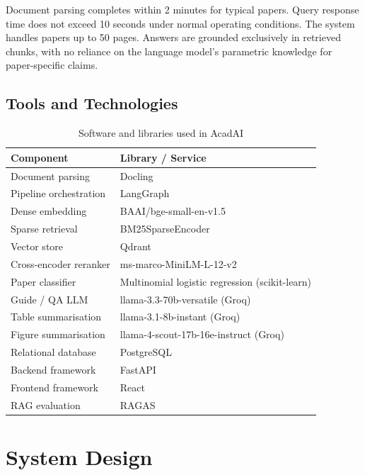 \documentclass[12pt,a4paper]{report}
\begin{document}
Document parsing completes within 2 minutes for typical papers. Query response
time does not exceed 10 seconds under normal operating conditions. The system
handles papers up to 50 pages. Answers are grounded exclusively in retrieved
chunks, with no reliance on the language model's parametric knowledge for
paper-specific claims.

\section{Tools and Technologies}

\begin{table}[h]
\centering
\begin{tabular}{ll}
\toprule
\textbf{Component} & \textbf{Library / Service} \\
\midrule
Document parsing        & Docling \\
Pipeline orchestration  & LangGraph \\
Dense embedding         & BAAI/bge-small-en-v1.5 \\
Sparse retrieval        & BM25SparseEncoder \\
Vector store            & Qdrant \\
Cross-encoder reranker  & ms-marco-MiniLM-L-12-v2 \\
Paper classifier        & Multinomial logistic regression (scikit-learn) \\
Guide / QA LLM          & llama-3.3-70b-versatile (Groq) \\
Table summarisation     & llama-3.1-8b-instant (Groq) \\
Figure summarisation    & llama-4-scout-17b-16e-instruct (Groq) \\
Relational database     & PostgreSQL \\
Backend framework       & FastAPI \\
Frontend framework      & React \\
RAG evaluation          & RAGAS \\
\bottomrule
\end{tabular}
\caption{Software and libraries used in AcadAI}
\label{tab:software}
\end{table}

\chapter{System Design}
\end{document}
